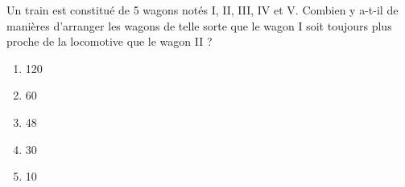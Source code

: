 Un train est constitué de 5 wagons notés I, II, III, IV et V. Combien
y a-t-il de manières d'arranger les wagons de telle sorte que le wagon
I soit toujours plus proche de la locomotive que le wagon II ?
\begin{multicols}{5}
  \begin{enumerate}[A/]
  \item 120
  \item 60
  \item 48
  \item 30
  \item 10
  \end{enumerate}
\end{multicols}
